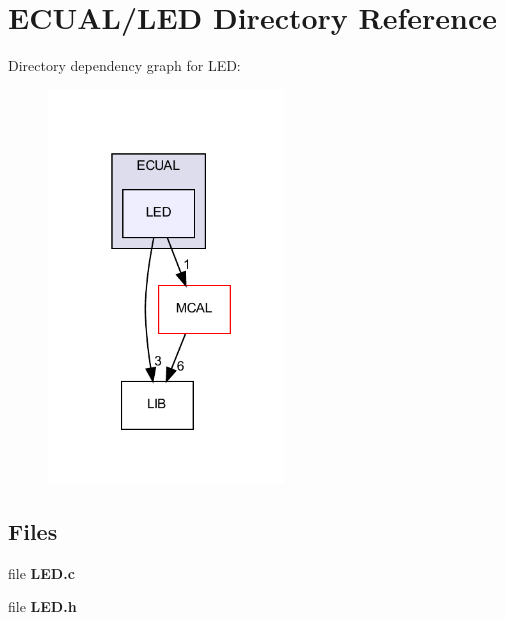 \section{E\+C\+U\+A\+L/\+L\+ED Directory Reference}
\label{dir_fa81e7dae32579235d99a82f66f4491f}
Directory dependency graph for L\+ED\+:
\nopagebreak
\begin{figure}[H]
\begin{center}
\leavevmode
\includegraphics[width=177pt]{dir_fa81e7dae32579235d99a82f66f4491f_dep}
\end{center}
\end{figure}
\subsection*{Files}
\begin{DoxyCompactItemize}
\item 
file \textbf{ L\+E\+D.\+c}
\item 
file \textbf{ L\+E\+D.\+h}
\end{DoxyCompactItemize}

